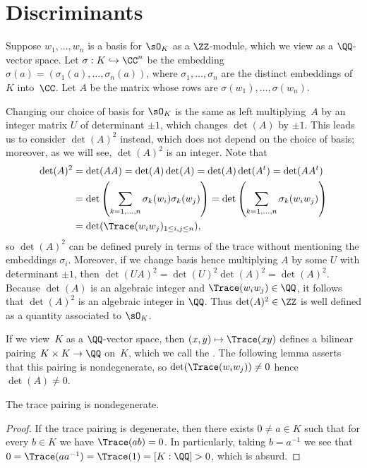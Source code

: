 \section{Discriminants}\label{sec:disc}
Suppose $w_1,\ldots, w_n$ is a basis for $\sO_K$ as a $\ZZ$-module,
which we view as a $\QQ$-vector space.  Let $ \sigma: K \hookrightarrow \CC^n $ be
the embedding $\sigma(a)=(\sigma_1(a),\ldots,\sigma_n(a))$, where
$\sigma_1,\ldots, \sigma_n$ are the distinct embeddings of $K$
into~$\CC$.  Let $A$ be the matrix whose rows are $\sigma(w_1), \ldots,
\sigma(w_n)$.

Changing our choice of
basis for $\sO_K$ is the same as left multiplying~$A$ by an integer
matrix $U$ of determinant $\pm 1$, which changes
$\det(A)$ by $\pm 1$.
This leads us to consider $\det(A)^2$ instead, which does not depend
on the choice of basis; moreover, as we will see, $\det(A)^2$ is an integer.
Note that
\begin{align*}
\det(A)^2 &= \det(AA) =
\det(A)\det(A)=\det(A)\det(A^t)=
\det(A A^t) \\
&= \det\left(\sum_{k=1,\ldots,n} \sigma_k(w_i)\sigma_k(w_j)\right)
= \det\left(\sum_{k=1,\ldots,n} \sigma_k(w_i w_j)\right)\\
&= \det(\Trace(w_i w_j)_{1\leq i,j\leq n}),
\end{align*}
so $\det(A)^2$ can be defined purely in terms of the trace without
mentioning the embeddings $\sigma_i$.
Moreover, if we change basis hence multiplying $A$ by some $U$ with determinant $\pm 1$, then
$\det(UA)^2 = \det(U)^2\det(A)^2 = \det(A)^2$.
Because $\det(A)$ is an algebraic integer and $\Trace(w_iw_j)\in\QQ$, it follows
that $\det(A)^2$ is an algebraic integer in $\QQ$.
Thus $\det(A)^2\in \ZZ$ is well defined as a quantity associated to $\sO_K$.

If we view~$K$ as a $\QQ$-vector space, then $(x,y)\mapsto \Trace(xy)$
defines a bilinear pairing $K\times K \to \QQ$ on~$K$, which we call
the .  The following lemma asserts that this
pairing is nondegenerate, so $\det(\Trace(w_i w_j))\neq 0$ hence
$\det(A)\neq 0$.
\begin{lemma}\label{lem:tracenondegen}
  The trace pairing is nondegenerate.
\end{lemma}
\begin{proof}
  If the trace pairing is degenerate, then there exists $0\neq a\in K$ such
  that for every $b\in K$ we have $\Trace(ab)=0$.  In particularly, taking
  $b=a^{-1}$ we see that $0=\Trace(a a^{-1})=\Trace(1)=[K:\QQ]>0$, which is
  absurd.
\end{proof}

